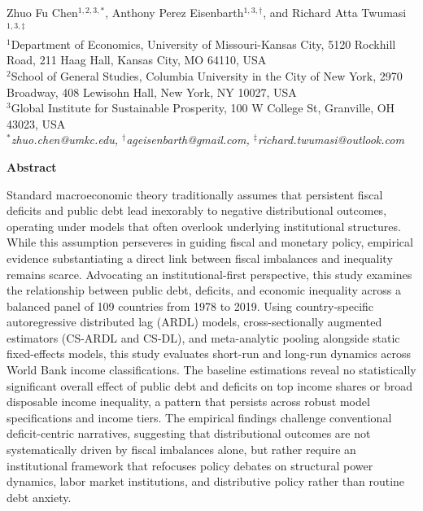 \documentclass[12pt, titlepage]{article}
\date{}
\numberwithin{equation}{section}
\begin{document}
	\begin{titlepage}
		\centering
		\LARGE{}\\
		\vspace{5mm}
		\normalsize{
			Zhuo Fu Chen\(^{1,2,3,\ast}\), 
			Anthony Perez Eisenbarth\(^{1,3,\dagger}\),
			and Richard Atta Twumasi\(^{1,3,\ddagger}\)
		}\\ \vspace{3mm}
		\small{
			\(^1\)Department of Economics, University of Missouri-Kansas City, 5120 Rockhill Road, 211 Haag Hall, Kansas City, MO 64110, USA\\
			\(^2\)School of General Studies, Columbia University in the City of New York, 2970 Broadway, 408 Lewisohn Hall, New York, NY 10027, USA\\
			\(^3\)Global Institute for Sustainable Prosperity, 100 W College St, Granville, OH 43023, USA
		}\\ \vspace{3mm}
		\textit{
			\small{
				\(^\ast\)zhuo.chen@umkc.edu, 
				\(^\dagger\)ageisenbarth@gmail.com, 
				\(^\ddagger\)richard.twumasi@outlook.com
			}
		}\\ \vspace{5mm}
		\begin{center}
			\textbf{Abstract}
		\end{center}
		\justifying
		Standard macroeconomic theory traditionally assumes that persistent fiscal deficits and public debt lead inexorably to negative distributional outcomes, operating under models that often overlook underlying institutional structures. While this assumption perseveres in guiding fiscal and monetary policy, empirical evidence substantiating a direct link between fiscal imbalances and inequality remains scarce. Advocating an institutional-first perspective, this study examines the relationship between public debt, deficits, and economic inequality across a balanced panel of 109 countries from 1978 to 2019. Using country-specific autoregressive distributed lag (ARDL) models, cross-sectionally augmented estimators (CS-ARDL and CS-DL), and meta-analytic pooling alongside static fixed-effects models, this study evaluates short-run and long-run dynamics across World Bank income classifications. The baseline estimations reveal no statistically significant overall effect of public debt and deficits on top income shares or broad disposable income inequality, a pattern that persists across robust model specifications and income tiers. The empirical findings challenge conventional deficit-centric narratives, suggesting that distributional outcomes are not systematically driven by fiscal imbalances alone, but rather require an institutional framework that refocuses policy debates on structural power dynamics, labor market institutions, and distributive policy rather than routine debt anxiety.


\end{titlepage}
\end{document}

